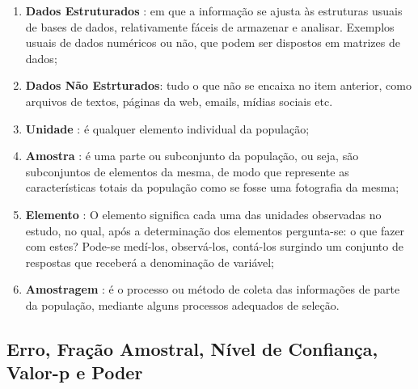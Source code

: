\begin{enumerate}

\item \textbf{Dados Estruturados} : em que a informação se ajusta às estruturas
usuais de bases de dados, relativamente fáceis de armazenar e analisar.
Exemplos usuais de dados numéricos ou não, que podem ser dispostos
em matrizes de dados;
\item \textbf{Dados Não Estrturados}: tudo o que não se encaixa no item anterior, como arquivos de textos, páginas da web, emails, mídias sociais etc.
\item \textbf{Unidade} : é qualquer elemento individual da população;
\item \textbf{Amostra} : é uma parte ou subconjunto da população, ou seja, são subconjuntos de elementos da mesma, de modo que represente as características totais da população como se fosse uma fotografia da mesma;
\item \textbf{Elemento} : O elemento significa cada uma das unidades observadas no estudo, no qual, após a determinação dos elementos pergunta-se: o que fazer com estes? Pode-se medí-los, observá-los, contá-los surgindo um conjunto de respostas que receberá a denominação de variável;

\item \textbf{Amostragem} : é o processo ou método de coleta das informações de parte da população, mediante alguns processos adequados de seleção.
\end{enumerate}

\subsection{Erro, Fração Amostral, Nível de Confiança, Valor-p e Poder}

